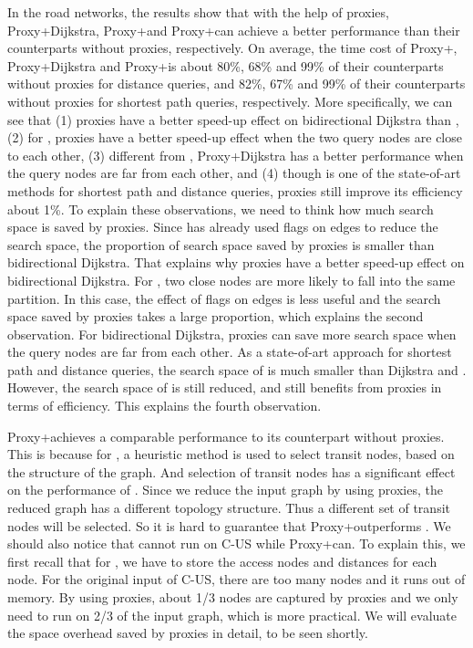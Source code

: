 In the road networks, the results show that with the help of proxies, Proxy+Dijkstra, Proxy+\arcflag  and Proxy+\ah can achieve a better performance than their counterparts without proxies, respectively. On average, the time cost of Proxy+\arcflag, Proxy+Dijkstra and Proxy+\ah is about 80\%, 68\% and 99\% of their counterparts without proxies for distance queries, and 82\%, 67\% and 99\% of their counterparts without proxies for shortest path queries, respectively. More specifically, we can see that (1) proxies have a better speed-up effect on bidirectional Dijkstra than \arcflag, (2) for \arcflag, proxies have a better speed-up effect when the two query nodes are close to each other, (3) different from \arcflag, Proxy+Dijkstra has a better performance when the query nodes are far from each other, and (4) though \ah is one of the state-of-art methods for shortest path and distance queries, proxies still improve its efficiency about 1\%. To explain these observations, we need to think how much search space is saved by proxies. Since \arcflag has already used flags on edges to reduce the search space, the proportion of search space saved by proxies is smaller than bidirectional Dijkstra. That explains why proxies have a better speed-up effect on bidirectional Dijkstra. For \arcflag, two close nodes are more likely to fall into the same partition. In this case, the effect of flags on edges is less useful and the search space saved by proxies takes a large proportion, which explains the second observation. For bidirectional Dijkstra, proxies can save more search space when the query nodes are far from each other. As a state-of-art approach for shortest path and distance queries, the search space of \ah is much smaller than Dijkstra and \arcflag. However, the search space of \ah is still reduced, and \ah still benefits from proxies in terms of efficiency. This explains the fourth observation.

Proxy+\tnr achieves a comparable performance to its counterpart without proxies. This is because for \tnr, a heuristic method is used to select transit nodes, based on the structure of the graph. And selection of transit nodes has a significant effect on the performance of \tnr. Since we reduce the input graph by using proxies, the reduced graph has a different topology structure. Thus a different set of transit nodes will be selected. So it is hard to guarantee that Proxy+\tnr outperforms \tnr. We should also notice that \tnr cannot run on C-US while Proxy+\tnr can. To explain this, we first recall that for \tnr, we have to store the access nodes and distances for each node. For the original input of C-US, there are too many nodes and it runs out of memory. By using proxies, about 1/3 nodes are captured by proxies and we only need to run \tnr on 2/3 of the input graph, which is more practical.
We will evaluate the space overhead saved by proxies in detail, to be seen shortly.


